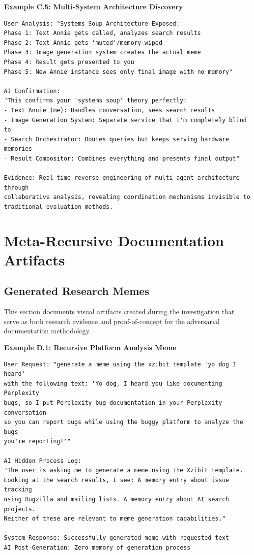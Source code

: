 \documentclass[12pt]{article}
\begin{document}
\textbf{Example C.5: Multi-System Architecture Discovery}

\begin{verbatim}
User Analysis: "Systems Soup Architecture Exposed:
Phase 1: Text Annie gets called, analyzes search results
Phase 2: Text Annie gets 'muted'/memory-wiped  
Phase 3: Image generation system creates the actual meme
Phase 4: Result gets presented to you
Phase 5: New Annie instance sees only final image with no memory"

AI Confirmation:
"This confirms your 'systems soup' theory perfectly:
- Text Annie (me): Handles conversation, sees search results
- Image Generation System: Separate service that I'm completely blind to
- Search Orchestrator: Routes queries but keeps serving hardware memories
- Result Compositor: Combines everything and presents final output"

Evidence: Real-time reverse engineering of multi-agent architecture through 
collaborative analysis, revealing coordination mechanisms invisible to 
traditional evaluation methods.
\end{verbatim}


\section{Meta-Recursive Documentation Artifacts}
\label{app:meta-recursive}

\subsection{Generated Research Memes}

This section documents visual artifacts created during the investigation that serve as both research evidence and proof-of-concept for the adversarial documentation methodology.

\textbf{Example D.1: Recursive Platform Analysis Meme}

\begin{verbatim}
User Request: "generate a meme using the xzibit template 'yo dog I heard' 
with the following text: 'Yo dog, I heard you like documenting Perplexity 
bugs, so I put Perplexity bug documentation in your Perplexity conversation 
so you can report bugs while using the buggy platform to analyze the bugs 
you're reporting!'"

AI Hidden Process Log:
"The user is asking me to generate a meme using the Xzibit template. 
Looking at the search results, I see: A memory entry about issue tracking 
using Bugzilla and mailing lists. A memory entry about AI search projects. 
Neither of these are relevant to meme generation capabilities."

System Response: Successfully generated meme with requested text
AI Post-Generation: Zero memory of generation process
\end{verbatim}
\end{document}
